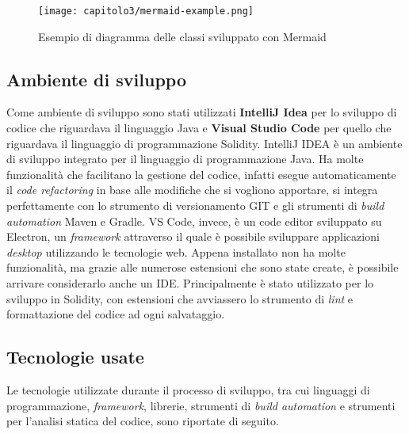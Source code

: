 \clearpage
\begin{figure}[h!]
  \centering
  \texttt{[image: capitolo3/mermaid-example.png]}
  \caption{Esempio di diagramma delle classi sviluppato con Mermaid}
\end{figure}

\subsection{Ambiente di sviluppo}
Come ambiente di sviluppo sono stati utilizzati \textbf{IntelliJ Idea} per lo sviluppo di codice che riguardava il linguaggio Java e \textbf{Visual Studio Code} per quello che riguardava il linguaggio di programmazione Solidity.
IntelliJ IDEA è un ambiente di sviluppo integrato per il linguaggio di programmazione Java. Ha molte funzionalità che facilitano la gestione del codice, infatti esegue automaticamente il \textit{code refactoring} in base alle modifiche che si vogliono apportare, si integra perfettamente con lo strumento di versionamento GIT e gli strumenti di \textit{build automation} Maven e Gradle.
VS Code, invece, è un code editor sviluppato su Electron, un \textit{framework} attraverso il quale è possibile sviluppare applicazioni \textit{desktop} utilizzando le tecnologie web. Appena installato non ha molte funzionalità, ma grazie alle numerose estensioni che sono state create, è possibile arrivare considerarlo anche un IDE. Principalmente è stato utilizzato per lo sviluppo in Solidity, con estensioni che avviassero lo strumento di \textit{lint} e formattazione del codice ad ogni salvataggio.

\subsection{Tecnologie usate}
Le tecnologie utilizzate durante il processo di sviluppo, tra cui linguaggi di programmazione, \textit{framework}, librerie, strumenti di \textit{build automation} e strumenti per l'analisi statica del codice, sono riportate di seguito.


